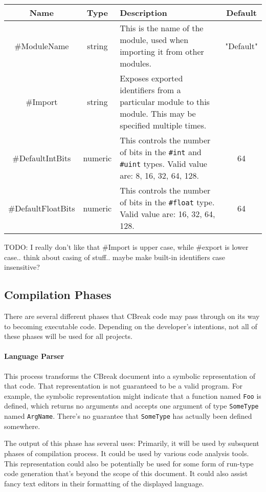 \documentclass{article}
\newcommand{\code}[1]{\colorbox{light-gray}{\texttt{#1}}}
\newcommand{\breakingparagraph}[1]{\paragraph{#1}\mbox{}\medbreak}
\begin{document}
\begin{tabular}{ |c|c|p{10cm}|c| }
  \hline
  \textbf{Name} & \textbf{Type} & \textbf{Description} & \textbf{Default}\\\hline
  \#ModuleName & string & This is the name of the module, used when importing it from other modules. & "Default"\\\hline
  \#Import & string & Exposes exported identifiers from a particular module to this module.  This may be specified multiple times. & \\\hline
  \#DefaultIntBits & numeric & This controls the number of bits in the \code{\#int} and \code{\#uint} types.  Valid value are: 8, 16, 32, 64, 128. & 64\\\hline
  \#DefaultFloatBits & numeric & This controls the number of bits in the \code{\#float} type.  Valid value are: 16, 32, 64, 128.& 64\\\hline
\end{tabular}

TODO: I really don't like that \#Import is upper case, while \#export is lower case.. think about casing of stuff.. maybe make built-in identifiers case insensitive?

\subsection{Compilation Phases}

There are several different phases that CBreak code may pass through on its way to becoming executable code.  Depending on the developer's intentions, not all of these phases will be used for all projects.

\breakingparagraph{Language Parser}

This process transforms the CBreak document into a symbolic representation of that code.  That representation is not guaranteed to be a valid program.  For example, the symbolic representation might indicate that a function named \code{Foo} is defined, which returns no arguments and accepts one argument of type \code{SomeType} named \code{ArgName}.  There's no guarantee that \code{SomeType} has actually been defined somewhere.

The output of this phase has several uses: Primarily, it will be used by subsquent phases of compilation process.  It could be used by various code analysis tools.  This representation could also be potentially be used for some form of run-type code generation that's beyond the scope of this document.  It could also assist fancy text editors in their formatting of the displayed language.  
\end{document}
